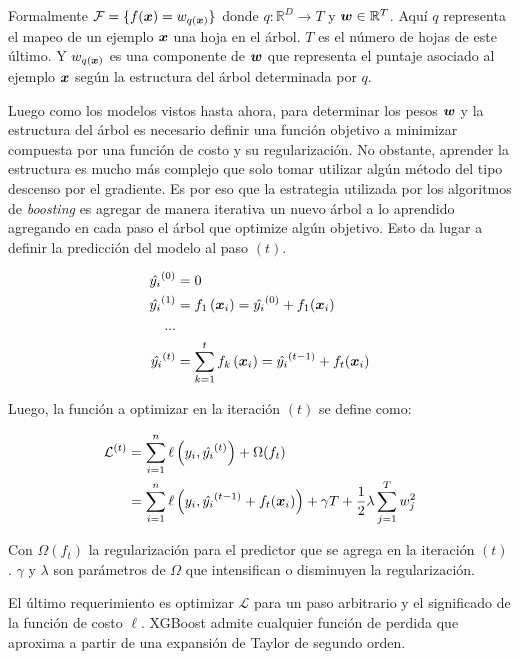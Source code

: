 Formalmente $\mathcal{F} = \{f(\boldsymbol{x}) = w_{q\left( \boldsymbol{x} \right)}\}$ donde
$q : \mathbb{R}^{D} \rightarrow T$ y $\boldsymbol{w} \in \mathbb{R}^{T}$. Aquí $q$
representa el mapeo de un ejemplo $\boldsymbol{x}$ una hoja en el árbol. $T$ es el
número de hojas de este último. Y $w_{q\left( \boldsymbol{x} \right)}$ es una
componente de $\boldsymbol{w}$ que representa el puntaje asociado al ejemplo
$\boldsymbol{x}$ según la estructura del árbol determinada por $q$.

Luego como los modelos vistos hasta ahora, para determinar los pesos $\boldsymbol{w}$
y la estructura del árbol es necesario definir una función objetivo a minimizar
compuesta por una función de costo y su regularización. No obstante, aprender la
estructura es mucho más complejo que solo tomar utilizar algún método del tipo
descenso por el gradiente. Es por eso que la estrategia utilizada por los
algoritmos de \emph{boosting} es agregar de manera iterativa un nuevo árbol a lo
aprendido agregando en cada paso el árbol que optimize algún objetivo. Esto da
lugar a definir la predicción del modelo al paso $(t)$.

\begin{align*}
    \hat{y_i}^{(0)} &= 0 \\
    \hat{y_i}^{(1)} &= f_{1}\left( \boldsymbol{x}_i \right) = \hat{y_i}^{(0)} + f_1{(\boldsymbol{x}_i)} \\
    ... \\
    \hat{y_i}^{(t)} &= \sum_{k=1}^{t} f_{k} \left( \boldsymbol{x}_{i}\right) = \hat{y_i}^{(t - 1)} + f_t{(\boldsymbol{x}_i)}
\end{align*}

Luego, la función a optimizar en la iteración $(t)$ se define como:

\begin{align}
    \mathcal{L}^{(t)} &= \sum_{i=1}^{n} \ell\left( y_i, \hat{y_i}^{(t)} \right) + \Omega(f_t) \\
                      &= \sum_{i=1}^{n} \ell\left( y_i, \hat{y_i}^{(t - 1)} + f_t{(\boldsymbol{x}_i)} \right) + \gamma T + \frac{1}{2} \lambda \sum_{j=1}^{T} w_{j}^{2}
\end{align}

Con $\Omega(f_t)$ la regularización para el predictor que se agrega en la
iteración $(t)$. $\gamma$ y $\lambda$ son parámetros de $\Omega$ que intensifican o
disminuyen la regularización.

El último requerimiento es optimizar $\mathcal{L}$ para un paso arbitrario y el
significado de la función de costo $\ell$. XGBoost admite cualquier función de
perdida que aproxima a partir de una expansión de Taylor de segundo orden.

